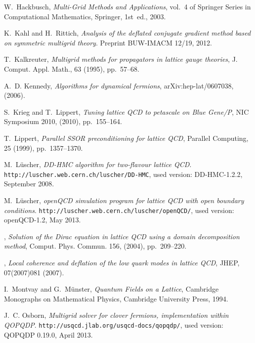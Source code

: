 \documentclass{siamltex}
\begin{document}
\begin{thebibliography}{10}
  {\sc W.~Hackbusch}, {\em Multi-Grid Methods and Applications}, vol.~4 of
  Springer Series in Computational Mathematics, Springer, 1st~ed., 2003.

  {\sc K.~Kahl and H.~Rittich}, {\em Analysis of the deflated conjugate gradient
      method based on symmetric multigrid theory}.
  \newblock Preprint BUW-IMACM 12/19, 2012.

  {\sc T.~Kalkreuter}, {\em Multigrid methods for propagators in lattice gauge
      theories}, J. Comput. Appl. Math., 63 (1995), pp.~57--68.

  {\sc A.~D. Kennedy}, {\em Algorithms for dynamical fermions},
  arXiv:hep-lat/0607038,  (2006).

  {\sc S.~Krieg and T.~Lippert}, {\em Tuning lattice {QCD} to petascale on {B}lue
  {G}ene/{P}}, {NIC} {S}ymposium 2010,  (2010), pp.~155--164.

  {\sc T.~Lippert}, {\em Parallel {SSOR} preconditioning for lattice {QCD}},
  Parallel Computing, 25 (1999), pp.~1357--1370.

  {\sc M.~L{\"{u}}scher}, {\em {DD-HMC} algorithm for two-flavour lattice {QCD}}.
  \newblock \texttt{http://luscher.web.cern.ch/luscher/DD-HMC}, used version:
  {DD-HMC}-1.2.2, September 2008.

  {\sc M.~L{\"{u}}scher}, {\em {openQCD} simulation program for lattice {QCD} with
      open boundary conditions}.
  \newblock \texttt{http://luscher.web.cern.ch/luscher/openQCD/}, used version:
  {openQCD}-1.2, May 2013.

  \leavevmode\vrule height 2pt depth -1.6pt width 23pt, {\em Solution of the
        {D}irac equation in lattice {QCD} using a domain decomposition method},
  Comput. Phys. Commun. 156,  (2004), pp.~209--220.

  \leavevmode\vrule height 2pt depth -1.6pt width 23pt, {\em Local coherence and
      deflation of the low quark modes in lattice {QCD}}, JHEP, 07(2007)081 (2007).

  {\sc I.~Montvay and G.~M{\"{u}}nster}, {\em Quantum Fields on a Lattice},
  Cambridge Monographs on Mathematical Physics, Cambridge University Press,
  1994.

  {\sc J.~C. Osborn}, {\em Multigrid solver for clover fermions, implementation
      within {QOPQDP}}.
  \newblock \texttt{http://usqcd.jlab.org/usqcd-docs/qopqdp/}, used version:
  QOPQDP 0.19.0, April 2013.


\end{thebibliography}
\end{document}
